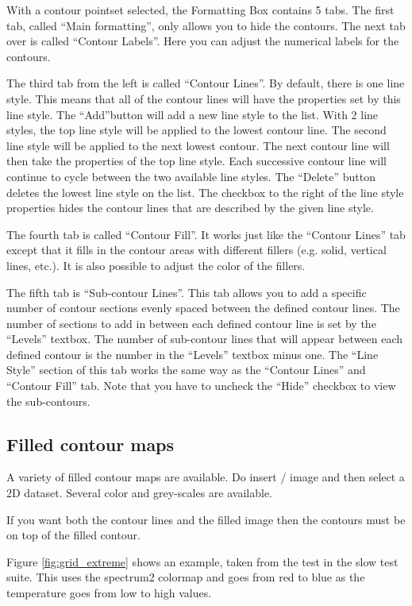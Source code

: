 With a contour pointset selected, the Formatting Box contains 5 tabs. The 
first tab, called ``Main formatting'', only allows you to hide the contours.
The next tab over is called ``Contour Labels''. 
Here you can adjust the numerical labels for the contours.

The third tab from the left is called ``Contour Lines''. By default, there is one line style. 
This means that all of the contour lines will have the properties set by this line style. 
The ``Add''button will add a new line style to the list. With 2 line styles, 
the top line style will be applied to the lowest contour line. The second line style 
will be applied to the next lowest contour. The next contour line will then 
take the properties of the top line style. Each successive contour line will 
continue to cycle between the two available line styles. The ``Delete'' 
button deletes the lowest line style on the list. The checkbox to the right 
of the line style properties hides the contour lines that are described by 
the given line style.

The fourth tab is called ``Contour Fill''. It works just like the ``Contour Lines'' tab except
that it fills in the contour areas with different fillers (e.g. solid, vertical lines, etc.). It is also possible
to adjust the color of the fillers.

The fifth tab is ``Sub-contour Lines''. This tab allows you to add a specific number of contour sections evenly spaced between the defined
contour lines. The number of sections to add in between each defined contour line is set by the ``Levels'' textbox. The number of sub-contour lines that will appear between each defined contour is the number in the ``Levels'' textbox minus one. The ``Line Style'' section
of this tab works the same way as the ``Contour Lines'' and ``Contour Fill'' tab. Note that you have to uncheck the ``Hide'' checkbox to view
the sub-contours.

\subsection{Filled contour maps}

A variety of filled contour maps are available.  
Do insert / image and then select a 2D dataset.
Several color and grey-scales are available.

If you want both the contour lines and the filled image then the contours must be
on top of the filled contour.  

Figure \ref{fig:grid_extreme} shows an example, 
taken from the  test in the slow test suite.
This uses the spectrum2 colormap and goes from red to blue as the
temperature goes from low to high values.

